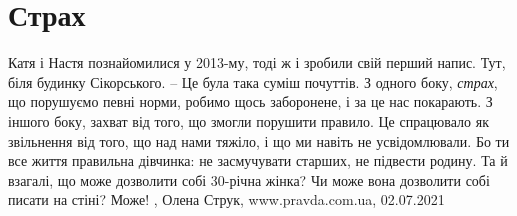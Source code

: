  
 
 
 
 
\chapter{Страх}

Катя і Настя познайомилися у 2013-му, тоді ж і зробили свій перший напис. Тут,
біля будинку Сікорського. – Це була така суміш почуттів. З одного боку,
\emph{страх}, що порушуємо певні норми, робимо щось заборонене, і за це нас
покарають. З іншого боку, захват від того, що змогли порушити правило. Це
спрацювало як звільнення від того, що над нами тяжіло, і що ми навіть не
усвідомлювали.  Бо ти все життя правильна дівчинка: не засмучувати старших, не
підвести родину.  Та й взагалі, що може дозволити собі 30-річна жінка? Чи може
вона дозволити собі писати на стіні? Може!
, 
Олена Струк, www.pravda.com.ua, 02.07.2021 

